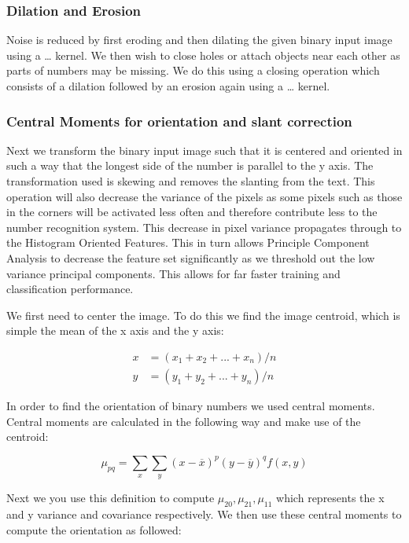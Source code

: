 \documentclass[%
        compressed,
        final,
        notitlepage,
        narroweqnarray,
        inline,
        twoside,
        ]{ieee}
\begin{document}
\subsubsection{Dilation and Erosion}

Noise is reduced by first eroding and then dilating the given binary input image
using a … kernel. We then wish to close holes or attach objects near each other
as parts of numbers may be missing. We do this using a closing operation which
consists of a dilation followed by an erosion again using a … kernel.

\subsubsection{Central Moments for orientation and slant correction}
Next we transform the binary input image such that it is centered and oriented in such a way that the longest side of the number is parallel to the y axis. The transformation used is skewing and removes the slanting from the text. This operation will also decrease the variance of the pixels as some pixels such as those in the corners will be activated less often and therefore contribute less to the number recognition system. This decrease in pixel variance propagates through to the Histogram Oriented Features. This in turn allows Principle Component Analysis to decrease the feature set significantly as we threshold out the low variance principal components. This allows for far faster training and classification performance.

We first need to center the image. To do this we find the image centroid, which is simple the mean of the x axis and the y axis:

\begin{align}
    x&=(x_1+x_2+...+x_n)/n \\
    y&=(y_1+y_2+...+y_n)/n
\end{align}

In order to find the orientation of binary numbers we used central moments. Central moments are calculated in the following way and make use of the centroid:

\begin{equation}
    \mu_{pq} = \sum_x \sum_y (x - \overline{x})^p(y - \overline{y})^q f(x, y)
\end{equation}

 
Next we you use this definition to compute $\mu_{20}, \mu_{21}, \mu_{11}$ which represents the x and y variance and covariance respectively. We then use these central moments to compute the orientation as followed:
\end{document}
